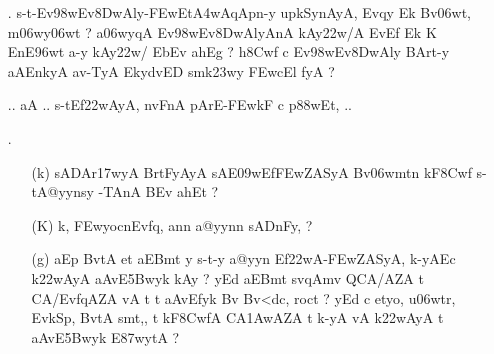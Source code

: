 \def\DevnagVersion{2.15}\documentclass{article}
\begin{document}
\begin{itemize}
\begin{itemize}
              \item[({\dn g})] {\dn aEKlBrtFyAyA, mAnEvk{\rs -\re}v\4\3E2wAEnk{\rs -\re}yAE\306w/k{\rs -\re}pErBqAyA, \3FEwZAyn\?{\rs ,\re} aEKlBArtopyogAT\0 pAWy-tkAnA\2 Evrcn\? c{\rs ,\re} s\2-t\2 EkydvED upkArk\2 Bv\? {\rs ?\re} } 
              
              \item[({\dn G})] {\dn idAnFtnFnA\2 BrtFyBqAZA t\3CEwtrA@yyn-y t\? s\2-t aAv-ykEvqy(v\?n EnyoQytA ahA\0Et{\rs ,\re} iEt aE-t Ek\2 BvtA aEBmt {\rs ?\re}}
                            
            \end{itemize}
 
 \item[{\dn \dnnum \rn{9}}.] {\dn s\2-t{\rs -\re}Ev\398wEv\38DwAly{\rs -\re}\3FEwEt\3A4wAqApn-y upkSynAyA, Evqy\? Ek\2 Bv\306wt, m\306wy\306wt\? {\rs ?\re} a\306wy\?qA\2 Ev\398wEv\38DwAlyAnA\2 kAy\0\322w\?/A  EvEf\2 Ek\2  K EnE\396wt a-y kAy\0\322w\?/\2 EbEv ah\0Eg {\rs ?\re} h\0\38Cwf\2 c Ev\398wEv\38DwAly\2 BArt-y aAEnkyA av-TyA EkydvED smk\323wy\2 \3FEwcEl\2 fyA {\rs ?\re}} 
   
   {\dn .. aA .. s\2-tEf\322wAyA, nvFnA pArE-\3FEwkF c p\388wEt, ..}


\item[{\dn \dnnum \rn{10} }.] \begin{itemize}

            \item[({\dn k})] {\dn sA\2DAr\317wyA\2 BrtFyAyA\2 sAE\309wEf\3FEwZASyA\2 Bv\306wmt\?n kF\38Cwf\2 s\2-tA@yynsy -TAnA\2  BEv ah\0Et {\rs ?\re}}
            
            \item[({\dn K})] {\dn k, \3FEwyocnEvf\?q, an\?n a@yyn\?n sADnFy, {\rs ?\re}}
            
            \item[({\dn g})] {\dn aEp BvtA et aEBmt y s\2-t-y a@yyn\2 Ef\322wA{\rs -\re}\3FEwZASyA, k-yA\2Ec k\322wAyA aAvE\35Bwyk\2 kAy\0 {\rs ?\re} yEd aEBmt {\dn \dnnum {\rs (\re}} sv\4qAm\?v QCA/AZA\2 t\?{\rs ,\re} {\dn \dnnum{\rs (\re}}  CA/Evf\?qAZA\2 vA t\?{\rs ,\re} t aAvEfyk\2 Bv Bv<dc, roc\?t {\rs ?\re} yEd c etyo, u\306wtr, EvkSp, BvtA\2 s\2mt,{\rs ,\re} t kF\38CwfA\2 CA\31AwAZA t\?{\rs ,\re} k-yA\2 vA k\322wAyA\2{\rs ,\re} t aAvE\35Bwyk\2 E\387wytA {\rs ?\re}} 
            

\end{itemize}
\end{itemize}
\end{document}
